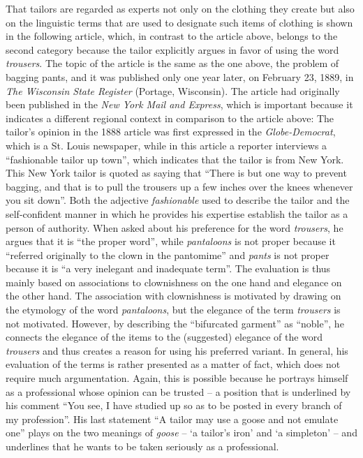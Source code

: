 That tailors are regarded as experts not only on the clothing they create but also on the linguistic terms that are used to designate such items of clothing is shown in the following article, which, in contrast to the article above, belongs to the second category because the tailor explicitly argues in favor of using the word \emph{trousers}. The topic of the article is the same as the one above, the problem of bagging pants, and it was published only one year later, on February 23, 1889, in \emph{The Wisconsin State Register} (Portage, Wisconsin). The article had originally been published in the \emph{New York Mail and Express}, which is important because it indicates a different regional context in comparison to the article above: The tailor’s opinion in the 1888 article was first expressed in the \emph{Globe-Democrat}, which is a St. Louis newspaper, while in this article a reporter interviews a “fashionable tailor up town”, which indicates that the tailor is from New York. This New York tailor is quoted as saying that “There is but one way to prevent bagging, and that is to pull the trousers up a few inches over the knees whenever you sit down”. Both the adjective \emph{fashionable} used to describe the tailor and the self-confident manner in which he provides his expertise establish the tailor as a person of authority. When asked about his preference for the word \emph{trousers}, he argues that it is “the proper word”, while \emph{pantaloons} is not proper because it “referred originally to the clown in the pantomime” and \emph{pants} is not proper because it is “a very inelegant and inadequate term”. The evaluation is thus mainly based on associations to clownishness on the one hand and elegance on the other hand. The association with clownishness is motivated by drawing on the etymology of the word \emph{pantaloons}, but the elegance of the term \emph{trousers} is not motivated. However, by describing the “bifurcated garment” as “noble”, he connects the elegance of the items to the (suggested) elegance of the word \emph{trousers} and thus creates a reason for using his preferred variant. In general, his evaluation of the terms is rather presented as a matter of fact, which does not require much argumentation. Again, this is possible because he portrays himself as a professional whose opinion can be trusted – a position that is underlined by his comment “You see, I have studied up so as to be posted in every branch of my profession”. His last statement “A tailor may use a goose and not emulate one” plays on the two meanings of \emph{goose} – ‘a tailor’s iron’ and ‘a simpleton’ – and underlines that he wants to be taken seriously as a professional.

